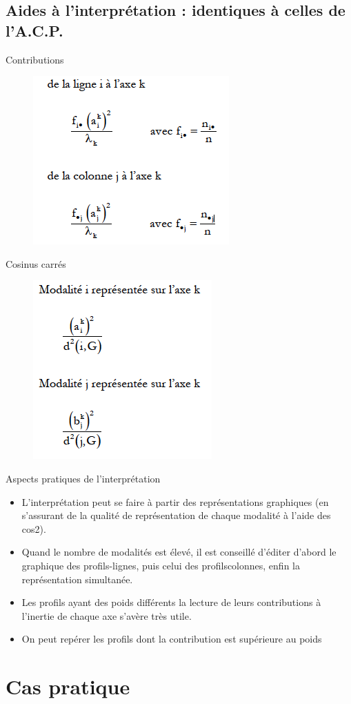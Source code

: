 \documentclass[11pt]{beamer}
\begin{document}
\subsection{Aides à l’interprétation : identiques à celles de l’A.C.P.}
\begin{frame}{Contributions}
\begin{figure}
\includegraphics[scale=0.6]{exemple16.png}  
\end{figure}
\end{frame}

\begin{frame}{Cosinus carrés}
\begin{figure}
\includegraphics[scale=0.6]{exemple17.png}  
\end{figure}

\end{frame}

\begin{frame}{Aspects pratiques de l’interprétation}

\begin{itemize}
\item L’interprétation peut se faire à partir des représentations graphiques (en s’assurant de la qualité de représentation de chaque modalité à
l’aide des cos2).
\item Quand le nombre de modalités est élevé, il est conseillé d’éditer d’abord le graphique des profils-lignes, puis celui des profilscolonnes, enfin la représentation simultanée.

\item Les profils ayant des poids différents la lecture de leurs
contributions à l’inertie de chaque axe s’avère très utile.

\item On peut repérer les profils dont la contribution est supérieure au poids
\end{itemize}
\end{frame}

\section{Cas pratique}
\begin{frame}{}

\end{frame}
\end{document}

